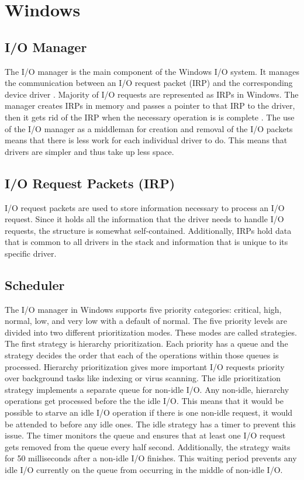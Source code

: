 \section{Windows}
\subsection{I/O Manager}
The I/O manager is the main component of the Windows I/O system. It manages the communication between an I/O request packet (IRP) and the corresponding device driver \cite{WindowsText}. Majority of I/O requests are represented as IRPs in Windows. The manager creates IRPs  in memory and passes a pointer to that IRP to the driver, then it gets rid of the IRP when the necessary operation is is complete \cite{WindowsText}. The use of the I/O manager as a middleman for creation and removal of the I/O packets means that there is less work for each individual driver to do. This means that drivers are simpler and thus take up less space. 

\subsection{I/O Request Packets (IRP)}
I/O request packets are used to store information necessary to process an I/O request. Since it holds all the information that the driver needs to handle I/O requests, the structure is somewhat self-contained. Additionally, IRPs hold data that is common to all drivers in the stack and information that is unique to its specific driver\cite{WindowsText}.

\subsection{Scheduler}
The I/O manager in Windows supports five priority categories: critical, high, normal, low, and very low with a default of normal\cite{WindowsText}. The five priority levels are divided into two different prioritization modes. These modes are called strategies. The first strategy is hierarchy prioritization. Each priority has a queue and the strategy decides the order that each of the operations within those queues is processed. Hierarchy prioritization gives more important I/O requests priority over background tasks like indexing or virus scanning. The idle prioritization strategy implements a separate queue for non-idle I/O. Any non-idle, hierarchy operations get processed before the the idle I/O\cite{WindowsText}. This means that it would be possible to starve an idle I/O operation if there is one non-idle request, it would be attended to before any idle ones. The idle strategy has a timer to prevent this issue. The timer monitors the queue and ensures that at least one I/O request gets removed from the queue every half second\cite{WindowsText}. Additionally, the strategy waits for 50 milliseconds after a non-idle I/O finishes\cite{WindowsText}. This waiting period prevents any idle I/O currently on the queue from occurring in the middle of non-idle I/O.  

